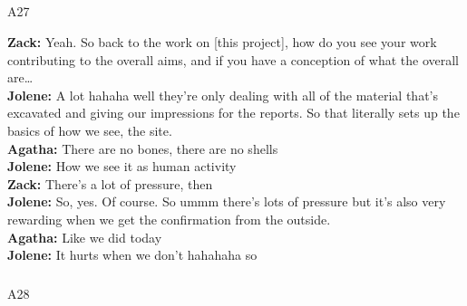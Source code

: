 \documentclass[
  canadian,
]{article}
\makeatletter
\let\oldsubparagraph\subparagraph
\renewcommand{\subparagraph}{
    \@ifstar
      \xxxSubParagraphStar
      \xxxSubParagraphNoStar
  }
\newcommand{\xxxSubParagraphStar}[1]{\oldsubparagraph*{#1}\mbox{}}
\newcommand{\xxxSubParagraphNoStar}[1]{\oldsubparagraph{#1}\mbox{}}
\makeatother
\begin{document}
\subparagraph{A27}\label{sec-A27}

\textbf{Zack:} Yeah. So back to the work on {[}this project{]}, how do
you see your work contributing to the overall aims, and if you have a
conception of what the overall are\ldots{}\\
\textbf{Jolene:} A lot hahaha well they're only dealing with all of the
material that's excavated and giving our impressions for the reports. So
that literally sets up the basics of how we see, the site.\\
\textbf{Agatha:} There are no bones, there are no shells\\
\textbf{Jolene:} How we see it as human activity\\
\textbf{Zack:} There's a lot of pressure, then\\
\textbf{Jolene:} So, yes. Of course. So ummm there's lots of pressure
but it's also very rewarding when we get the confirmation from the
outside.\\
\textbf{Agatha:} Like we did today\\
\textbf{Jolene:} It hurts when we don't hahahaha so

\subparagraph{A28}\label{sec-A28}
\end{document}
